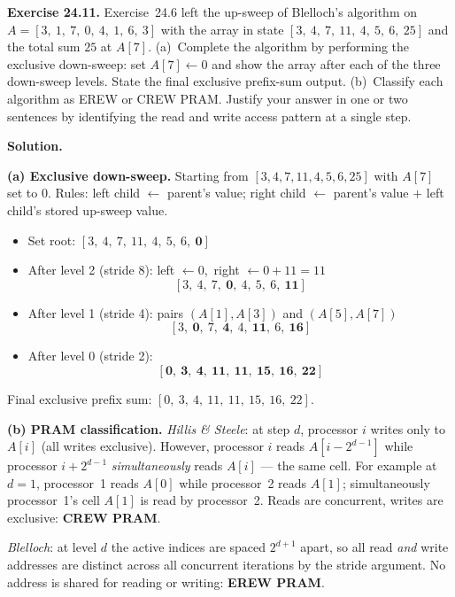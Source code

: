 \begin{ppexercises}
\textbf{Exercise 24.11.} Exercise~24.6 left the up-sweep of Blelloch's
algorithm on $A = [3,\ 1,\ 7,\ 0,\ 4,\ 1,\ 6,\ 3]$ with the array in
state $[3,\ 4,\ 7,\ 11,\ 4,\ 5,\ 6,\ 25]$ and the total sum $25$ at
$A[7]$. (a)~Complete the algorithm by performing the exclusive
down-sweep: set $A[7] \leftarrow 0$ and show the array after each of
the three down-sweep levels. State the final exclusive prefix-sum
output. (b)~Classify each algorithm as EREW or CREW PRAM. Justify
your answer in one or two sentences by identifying the read and write
access pattern at a single step.

\medskip
\textbf{Solution.}

\textbf{(a) Exclusive down-sweep.} Starting from $[3,4,7,11,4,5,6,25]$
with $A[7]$ set to $0$.  Rules: left child $\leftarrow$ parent's value;
right child $\leftarrow$ parent's value $+$ left child's stored
up-sweep value.

\begin{itemize}[leftmargin=*]
  \item Set root: $[3,\ 4,\ 7,\ 11,\ 4,\ 5,\ 6,\ \mathbf{0}]$
  \item After level 2 (stride 8): left $\leftarrow 0$,\ right $\leftarrow 0+11=11$
    \[ [3,\ 4,\ 7,\ \mathbf{0},\ 4,\ 5,\ 6,\ \mathbf{11}] \]
  \item After level 1 (stride 4): pairs $(A[1],A[3])$ and $(A[5],A[7])$
    \[ [3,\ \mathbf{0},\ 7,\ \mathbf{4},\ 4,\ \mathbf{11},\ 6,\ \mathbf{16}] \]
  \item After level 0 (stride 2):
    \[ [\mathbf{0},\ \mathbf{3},\ \mathbf{4},\ \mathbf{11},\ \mathbf{11},\ \mathbf{15},\ \mathbf{16},\ \mathbf{22}] \]
\end{itemize}

Final exclusive prefix sum: $[0,\ 3,\ 4,\ 11,\ 11,\ 15,\ 16,\ 22]$.

\textbf{(b) PRAM classification.}
\emph{Hillis \& Steele}: at step $d$, processor $i$ writes only to
$A[i]$ (all writes exclusive). However, processor $i$ reads
$A[i-2^{d-1}]$ while processor $i + 2^{d-1}$ \emph{simultaneously}
reads $A[i]$ --- the same cell. For example at $d=1$, processor~1 reads
$A[0]$ while processor~2 reads $A[1]$; simultaneously processor~1's
cell $A[1]$ is read by processor~2. Reads are concurrent, writes are
exclusive: \textbf{CREW PRAM}.

\emph{Blelloch}: at level $d$ the active indices are spaced $2^{d+1}$
apart, so all read \emph{and} write addresses are distinct across all
concurrent iterations by the stride argument. No address is shared for
reading or writing: \textbf{EREW PRAM}.
\end{ppexercises}

